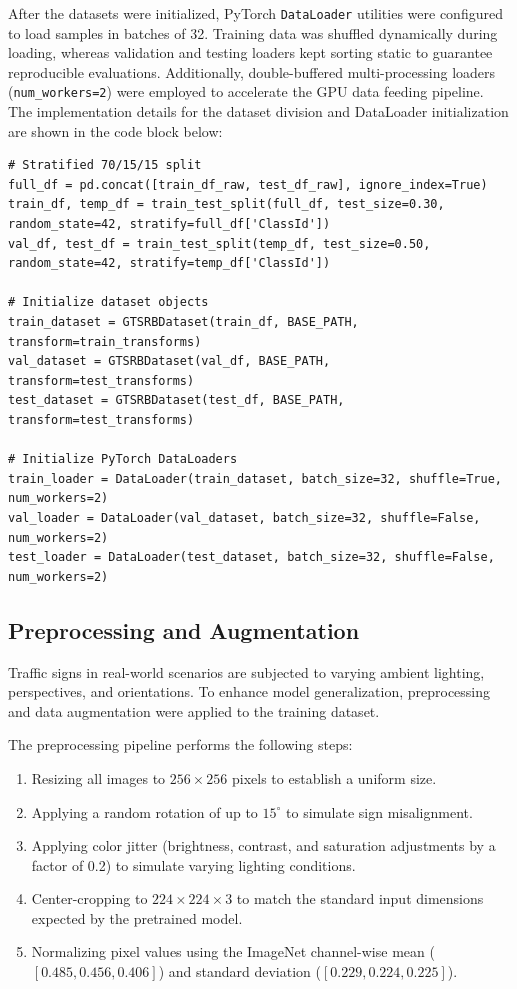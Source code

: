 \documentclass[conference]{IEEEtran}
\begin{document}
After the datasets were initialized, PyTorch \texttt{DataLoader} utilities were configured to load samples in batches of 32. Training data was shuffled dynamically during loading, whereas validation and testing loaders kept sorting static to guarantee reproducible evaluations. Additionally, double-buffered multi-processing loaders (\texttt{num\_workers=2}) were employed to accelerate the GPU data feeding pipeline. The implementation details for the dataset division and DataLoader initialization are shown in the code block below:

\begin{lstlisting}
# Stratified 70/15/15 split
full_df = pd.concat([train_df_raw, test_df_raw], ignore_index=True)
train_df, temp_df = train_test_split(full_df, test_size=0.30, random_state=42, stratify=full_df['ClassId'])
val_df, test_df = train_test_split(temp_df, test_size=0.50, random_state=42, stratify=temp_df['ClassId'])

# Initialize dataset objects
train_dataset = GTSRBDataset(train_df, BASE_PATH, transform=train_transforms)
val_dataset = GTSRBDataset(val_df, BASE_PATH, transform=test_transforms)
test_dataset = GTSRBDataset(test_df, BASE_PATH, transform=test_transforms)

# Initialize PyTorch DataLoaders
train_loader = DataLoader(train_dataset, batch_size=32, shuffle=True, num_workers=2)
val_loader = DataLoader(val_dataset, batch_size=32, shuffle=False, num_workers=2)
test_loader = DataLoader(test_dataset, batch_size=32, shuffle=False, num_workers=2)
\end{lstlisting}

\subsection{Preprocessing and Augmentation}
Traffic signs in real-world scenarios are subjected to varying ambient lighting, perspectives, and orientations. To enhance model generalization, preprocessing and data augmentation were applied to the training dataset.

The preprocessing pipeline performs the following steps:
\begin{enumerate}
    \item Resizing all images to $256 \times 256$ pixels to establish a uniform size.
    \item Applying a random rotation of up to $15^\circ$ to simulate sign misalignment.
    \item Applying color jitter (brightness, contrast, and saturation adjustments by a factor of 0.2) to simulate varying lighting conditions.
    \item Center-cropping to $224 \times 224 \times 3$ to match the standard input dimensions expected by the pretrained model.
    \item Normalizing pixel values using the ImageNet channel-wise mean ($[0.485, 0.456, 0.406]$) and standard deviation ($[0.229, 0.224, 0.225]$).
\end{enumerate}
\end{document}
